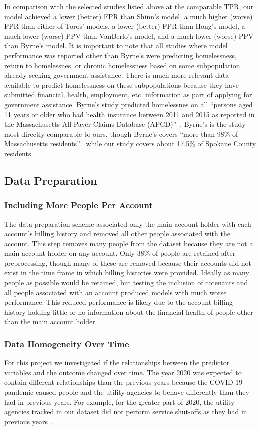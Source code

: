 \documentclass[10pt,letterpaper]{article}
\newcommand{\red}[1]{{\color{red}{#1}}}
\begin{document}
In comparison with the selected studies listed above at the comparable TPR, our model achieved a lower (better) FPR than Shinn's model, a much higher (worse) FPR than either of Toros' models, a lower (better) FPR than Hong's model, a much lower (worse) PPV than VanBerlo's model, and a much lower (worse) PPV than Byrne's model. It is important to note that all studies where model performance was reported other than Byrne's were predicting homelessness, return to homelessnes, or chronic homelessness based on some subpopulation already seeking government assistance. There is much more relevant data available to predict homelessness on these subpopulations because they have submitted financial, health, employment, etc. information as part of applying for government assistance. Byrne's study predicted homelessnes on all ``persons aged 11 years or older who had health insurance between 2011 and 2015 as reported in the Massachusetts All-Payer Claims Database (APCD)''~\cite{byrne2020classification}. Byrne's is the study most directly comparable to ours, though Byrne's covers ``more than 98\% of Massachusetts residents''~\cite{byrne2020classification} while our study covers about 17.5\% of Spokane County residents. \red{remove this since already talk about it in Review of Literature?}

\subsection*{Data Preparation}
\subsubsection*{Including More People Per Account}
The data preparation scheme associated only the main account holder with each account's billing history and removed all other people associated with the account. This step removes many people from the dataset because they are not a main account holder on any account. Only 38\% of people are retained after preprocessing, though many of these are removed because their accounts did not exist in the time frame in which billing histories were provided. Ideally as many people as possible would be retained, but testing the inclusion of cotenants and all people associated with an account produced models with much worse performance. This reduced performance is likely due to the account billing history holding little or no information about the financial health of people other than the main account holder.

\subsubsection*{Data Homogeneity Over Time}
For this project we investigated if the relationships between the predictor variables and the outcome changed over time. The year 2020 was expected to contain different relationships than the previous years because the COVID-19 pandemic caused people and the utility agencies to behave differently than they had in previous years. For example, for the greater part of 2020, the utility agencies tracked in our dataset did not perform service shut-offs as they had in previous years~\cite{white2020utilities}. 
\end{document}
